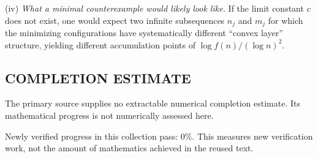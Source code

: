(iv) \emph{What a minimal counterexample would likely look like.} If the limit constant $c$ does not exist, one would expect two infinite subsequences $n_j$ and $m_j$ for which the minimizing configurations have systematically different ``convex layer'' structure, yielding different accumulation points of $\log f(n)/(\log n)^2$.




\subsection*{COMPLETION ESTIMATE}
The primary source supplies no extractable numerical completion estimate. Its mathematical progress is not numerically assessed here.

Newly verified progress in this collection pass: $0\%$. This measures new verification work, not the amount of mathematics achieved in the reused text.
